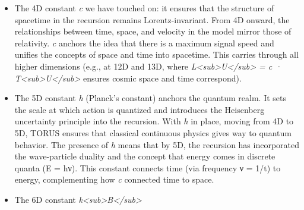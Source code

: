 \documentclass[
]{article}
\begin{document}
\begin{itemize}
  (t\textless sub\textgreater P\textless/sub\textgreater,
  ℓ\textless sub\textgreater P\textless/sub\textgreater, \emph{c},
  \emph{h}) are set, the value of \emph{G} (9D) must be such that this
  combination equals unity\hspace{0pt}, thereby \emph{determining}
  m\textless sub\textgreater P\textless/sub\textgreater. In effect,
  \emph{m\textless sub\textgreater P\textless/sub\textgreater{}} and
  \emph{G} are solved together to fit with the lower dimensions. The
  physical meaning is that at the 3D scale, a single particle's gravity
  is as strong as its quantum effects -- an anchor point where our usual
  separation of ``quantum vs gravity'' breaks down. TORUS takes the
  observed gravitational constant and shows it indeed yields a Planck
  mass of \textasciitilde2×10\^{}−8 kg, which matches this required
  balance. The fact that nature's actual \emph{G} produces the expected
  m\textless sub\textgreater P\textless/sub\textgreater{} is a strong
  consistency check for TORUS\hspace{0pt} -- it means the ``anchor'' was
  placed correctly.
\item
  The 4D constant \emph{c} we have touched on: it ensures that the
  structure of spacetime in the recursion remains Lorentz-invariant.
  From 4D onward, the relationships between time, space, and velocity in
  the model mirror those of relativity. \emph{c} anchors the idea that
  there is a maximum signal speed and unifies the concepts of space and
  time into spacetime. This carries through all higher dimensions (e.g.,
  at 12D and 13D, where
  \emph{L\textless sub\textgreater U\textless/sub\textgreater{} = c ·
  T\textless sub\textgreater U\textless/sub\textgreater{}} ensures
  cosmic space and time correspond\hspace{0pt}).
\item
  The 5D constant \emph{h} (Planck's constant) anchors the quantum
  realm. It sets the scale at which action is quantized and introduces
  the Heisenberg uncertainty principle into the recursion. With \emph{h}
  in place, moving from 4D to 5D, TORUS ensures that classical
  continuous physics gives way to quantum behavior. The presence of
  \emph{h} means that by 5D, the recursion has incorporated the
  wave-particle duality and the concept that energy comes in discrete
  quanta (E = hν). This constant connects time (via frequency ν = 1/t)
  to energy, complementing how \emph{c} connected time to space.
\item
  The 6D constant
  \emph{k\textless sub\textgreater B\textless/sub\textgreater{}}

\end{itemize}
\end{document}
